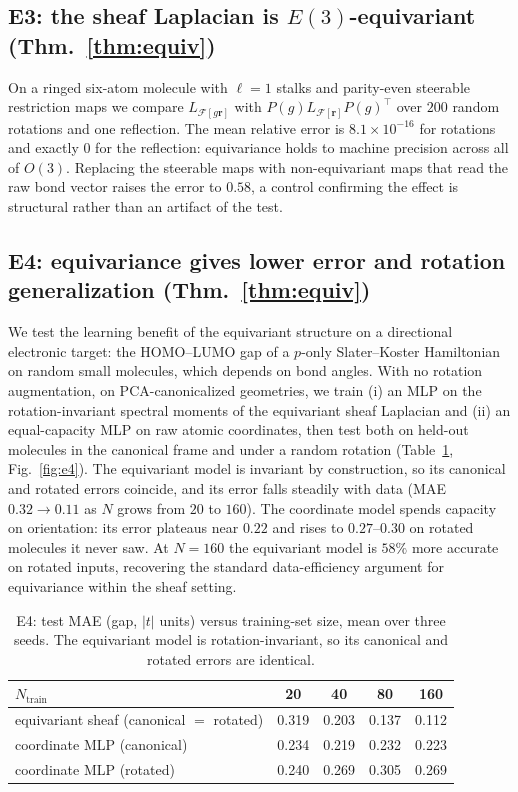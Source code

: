 \documentclass[pdflatex,sn-mathphys-num]{sn-jnl}%
\newcommand{\F}{\mathcal{F}}
\theoremstyle{thmstyleone}
\theoremstyle{thmstyletwo}
\theoremstyle{thmstylethree}
\begin{document}
\subsection{E3: the sheaf Laplacian is $E(3)$-equivariant (Thm.~\ref{thm:equiv})}
On a ringed six-atom molecule with $\ell=1$ stalks and parity-even steerable
restriction maps we compare $L_{\F[g\mathbf r]}$ with $P(g)L_{\F[\mathbf r]}P(g)^\top$
over $200$ random rotations and one reflection. The mean relative error is
$8.1\times10^{-16}$ for rotations and exactly $0$ for the reflection: equivariance
holds to machine precision across all of $O(3)$. Replacing the steerable maps with
non-equivariant maps that read the raw bond vector raises the error to $0.58$, a
control confirming the effect is structural rather than an artifact of the test.

\subsection{E4: equivariance gives lower error and rotation generalization (Thm.~\ref{thm:equiv})}
We test the learning benefit of the equivariant structure on a directional
electronic target: the HOMO--LUMO gap of a $p$-only Slater--Koster Hamiltonian on
random small molecules, which depends on bond angles. With no rotation
augmentation, on PCA-canonicalized geometries, we train (i) an MLP on the
rotation-invariant spectral moments of the equivariant sheaf Laplacian and (ii) an
equal-capacity MLP on raw atomic coordinates, then test both on held-out molecules
in the canonical frame and under a random rotation (Table~\ref{tab:e4},
Fig.~\ref{fig:e4}). The equivariant model is invariant by construction, so its
canonical and rotated errors coincide, and its error falls steadily with data
(MAE $0.32\to0.11$ as $N$ grows from $20$ to $160$). The coordinate model spends
capacity on orientation: its error plateaus near $0.22$ and rises to
$0.27$--$0.30$ on rotated molecules it never saw. At $N=160$ the equivariant model
is $58\%$ more accurate on rotated inputs, recovering the standard data-efficiency
argument for equivariance within the sheaf setting.

\begin{table}[t]
\centering\small
\caption{E4: test MAE (gap, $|t|$ units) versus training-set size, mean over three
seeds. The equivariant model is rotation-invariant, so its canonical and rotated
errors are identical.}
\label{tab:e4}
\begin{tabular}{lcccc}
\toprule
$N_{\text{train}}$ & 20 & 40 & 80 & 160\\
\midrule
equivariant sheaf (canonical $=$ rotated) & 0.319 & 0.203 & 0.137 & 0.112\\
coordinate MLP (canonical)                & 0.234 & 0.219 & 0.232 & 0.223\\
coordinate MLP (rotated)                  & 0.240 & 0.269 & 0.305 & 0.269\\
\bottomrule
\end{tabular}
\end{table}
\end{document}
